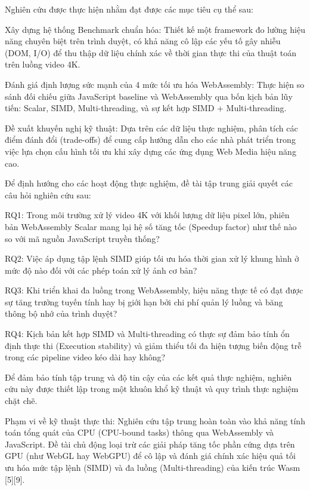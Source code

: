 
Nghiên cứu được thực hiện nhằm đạt được các mục tiêu cụ thể sau:


Xây dựng hệ thống Benchmark chuẩn hóa: Thiết kế một framework đo lường hiệu năng chuyên biệt trên trình duyệt, có khả năng cô lập các yếu tố gây nhiễu (DOM, I/O) để thu thập dữ liệu chính xác về thời gian thực thi của thuật toán trên luồng video 4K.


Đánh giá định lượng sức mạnh của 4 mức tối ưu hóa WebAssembly: Thực hiện so sánh đối chiếu giữa JavaScript baseline và WebAssembly qua bốn kịch bản lũy tiến: Scalar, SIMD, Multi-threading, và sự kết hợp SIMD + Multi-threading.


Đề xuất khuyến nghị kỹ thuật: Dựa trên các dữ liệu thực nghiệm, phân tích các điểm đánh đổi (trade-offs) để cung cấp hướng dẫn cho các nhà phát triển trong việc lựa chọn cấu hình tối ưu khi xây dựng các ứng dụng Web Media hiệu năng cao.



Để định hướng cho các hoạt động thực nghiệm, đề tài tập trung giải quyết các câu hỏi nghiên cứu sau:


RQ1: Trong môi trường xử lý video 4K với khối lượng dữ liệu pixel lớn, phiên bản WebAssembly Scalar mang lại hệ số tăng tốc (Speedup factor) như thế nào so với mã nguồn JavaScript truyền thống?


RQ2: Việc áp dụng tập lệnh SIMD giúp tối ưu hóa thời gian xử lý khung hình ở mức độ nào đối với các phép toán xử lý ảnh cơ bản?


RQ3: Khi triển khai đa luồng trong WebAssembly, hiệu năng thực tế có đạt được sự tăng trưởng tuyến tính hay bị giới hạn bởi chi phí quản lý luồng và băng thông bộ nhớ của trình duyệt?


RQ4: Kịch bản kết hợp SIMD và Multi-threading có thực sự đảm bảo tính ổn định thực thi (Execution stability) và giảm thiểu tối đa hiện tượng biến động trễ trong các pipeline video kéo dài hay không?



Để đảm bảo tính tập trung và độ tin cậy của các kết quả thực nghiệm, nghiên cứu này được thiết lập trong một khuôn khổ kỹ thuật và quy trình thực nghiệm chặt chẽ.



Phạm vi về kỹ thuật thực thi: Nghiên cứu tập trung hoàn toàn vào khả năng tính toán tổng quát của CPU (CPU-bound tasks) thông qua WebAssembly và JavaScript. Đề tài chủ động loại trừ các giải pháp tăng tốc phần cứng dựa trên GPU (như WebGL hay WebGPU) để cô lập và đánh giá chính xác hiệu quả tối ưu hóa mức tập lệnh (SIMD) và đa luồng (Multi-threading) của kiến trúc Wasm [5][9].


